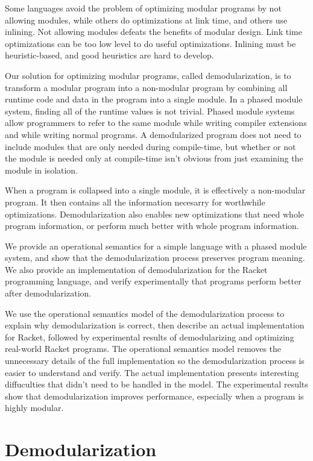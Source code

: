 \documentclass{llncs}
\begin{document}
Some languages avoid the problem of optimizing modular programs by not allowing modules, while others do optimizations at link time, and others use inlining. 
Not allowing modules defeats the benefits of modular design. 
Link time optimizations can be too low level to do useful optimizations. 
Inlining must be heuristic-based, and good heuristics are hard to develop. 

Our solution for optimizing modular programs, called demodularization, is to transform a modular program into a non-modular program by combining all runtime code and data in the program into a single module.
In a phased module system, finding all of the runtime values is not trivial.
Phased module systems allow programmers to refer to the same module while writing compiler extensions and while writing normal programs.
A demodularized program does not need to include modules that are only needed during compile-time, but whether or not the module is needed only at compile-time isn't obvious from just examining the module in isolation. 

When a program is collapsed into a single module, it is effectively a non-modular program. It then contains all the information necesarry for worthwhile optimizations. Demodularization also enables new optimizations that need whole program information, or perform much better with whole program information. 

We provide an operational semantics for a simple language with a phased module system, and show that the demodularization process preserves program meaning. We also provide an implementation of demodularization for the Racket programming language, and verify experimentally that programs perform better after demodularization.

We use the operational semantics model of the demodularization process to explain why demodularization is correct, then describe an actual implementation for Racket, followed by experimental results of demodularizing and optimizing real-world Racket programs. The operational semantics model removes the unnecessary details of the full implementation so the demodularization process is easier to understand and verify. The actual implementation presents interesting diffuculties that didn't need to be handled in the model. The experimental results show that demodularization improves performance, especially when a program is highly modular. 

\section{Demodularization}
\end{document}
